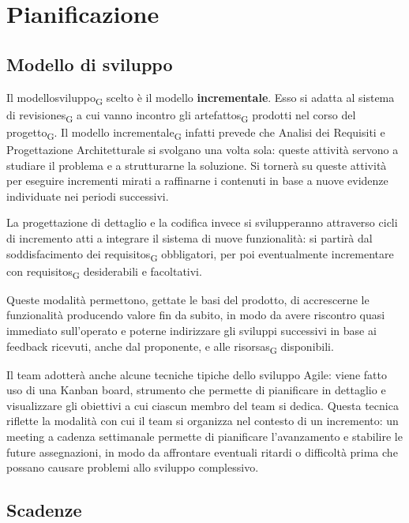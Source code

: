 \section{Pianificazione}

\subsection{Modello di sviluppo}

Il \gls{modellosviluppo}\textsubscript{G} scelto è il modello \textbf{incrementale}. Esso si adatta al sistema di \glspl{revisione}\textsubscript{G} a cui vanno incontro gli \glspl{artefatto}\textsubscript{G} prodotti nel corso del \gls{progetto}\textsubscript{G}. Il modello \gls{incrementale}\textsubscript{G} infatti prevede che Analisi dei Requisiti e Progettazione Architetturale si svolgano una volta sola: queste attività servono a studiare il problema e a strutturarne la soluzione. Si tornerà su queste attività per eseguire incrementi mirati a raffinarne i contenuti in base a nuove evidenze individuate nei periodi successivi.

La progettazione di dettaglio e la codifica invece si svilupperanno attraverso cicli di incremento atti a integrare il sistema di nuove funzionalità: si partirà dal soddisfacimento dei \glspl{requisito}\textsubscript{G} obbligatori, per poi eventualmente incrementare con \glspl{requisito}\textsubscript{G} desiderabili e facoltativi. 

Queste modalità permettono, gettate le basi del prodotto, di accrescerne le funzionalità producendo valore fin da subito, in modo da avere riscontro quasi immediato sull'operato e poterne indirizzare gli sviluppi successivi in base ai feedback ricevuti, anche dal proponente, e alle \glspl{risorsa}\textsubscript{G} disponibili.

Il team adotterà anche alcune tecniche tipiche dello sviluppo Agile: viene fatto uso di una Kanban board, strumento che permette di pianificare in dettaglio e visualizzare gli obiettivi a cui ciascun membro del team si dedica. Questa tecnica riflette la modalità con cui il team si organizza nel contesto di un incremento: un meeting a cadenza settimanale permette di pianificare l'avanzamento e stabilire le future assegnazioni, in modo da affrontare eventuali ritardi o difficoltà prima che possano causare problemi allo sviluppo complessivo.



\subsection{Scadenze}

